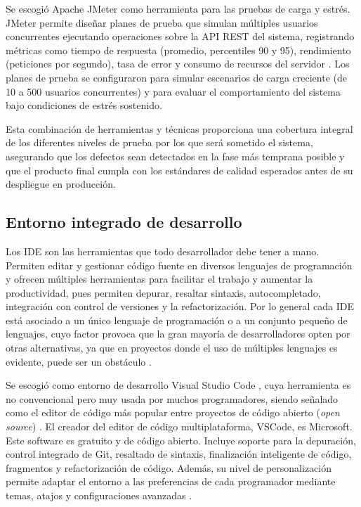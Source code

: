 Se escogió Apache JMeter como herramienta para las pruebas de carga y estrés. 
JMeter permite diseñar planes de prueba que simulan múltiples usuarios concurrentes ejecutando operaciones 
sobre la \ac{API} \ac{REST} del sistema, registrando métricas como tiempo de respuesta (promedio, percentiles 90 y 95), 
rendimiento (peticiones por segundo), tasa de error y consumo de recursos del servidor \citep{jmeter2025docs}. 
Los planes de prueba se configuraron para simular escenarios de carga creciente (de 10 a 500 usuarios 
concurrentes) y para evaluar el comportamiento del sistema bajo condiciones de estrés sostenido.
    
Esta combinación de herramientas y técnicas proporciona una cobertura integral de los diferentes niveles de prueba por los que será
sometido el sistema, asegurando que los defectos sean detectados en la fase más temprana posible y que el producto 
final cumpla con los estándares de calidad esperados antes de su despliegue en producción.
        
\subsection{Entorno integrado de desarrollo}

Los \ac{IDE} son las herramientas que 
todo desarrollador debe tener a mano. Permiten editar y gestionar
código fuente en diversos lenguajes de programación y ofrecen
múltiples herramientas para facilitar el trabajo y aumentar la productividad, pues
permiten depurar, resaltar sintaxis, autocompletado, integración con control de versiones
y la refactorización. Por lo general cada \ac{IDE} está asociado a un único 
lenguaje de programación o a un conjunto pequeño de lenguajes, cuyo factor 
provoca que la gran mayoría de desarrolladores opten por otras alternativas, 
ya que en proyectos donde el uso de múltiples lenguajes es evidente, 
puede ser un obstáculo \citep{ibm_IDE}.

Se escogió como entorno de desarrollo Visual Studio Code \citep{vscode2025}, cuya 
herramienta es no convencional pero muy usada por muchos programadores, 
siendo señalado como el editor de código más popular entre proyectos de código abierto 
(\textit{open source}) \citep{ramel2021VSCodePopularity}.
El creador del editor de código multiplataforma, VSCode, es Microsoft. Este software es
gratuito y de código abierto. Incluye soporte para la depuración, control
integrado de Git, resaltado de sintaxis, finalización inteligente de código,
fragmentos y refactorización de código. Además, 
su nivel de personalización permite adaptar el entorno a las preferencias de cada 
programador mediante temas, atajos y configuraciones avanzadas \citep{vscode_docs2025}.

